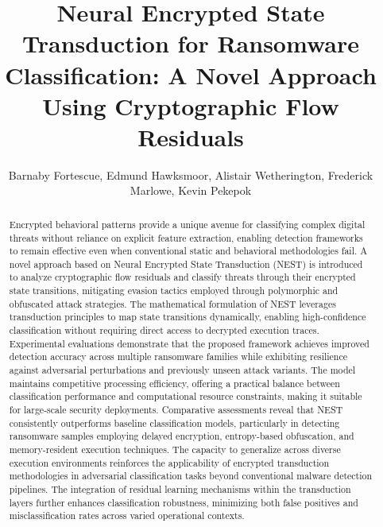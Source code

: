 \documentclass[lettersize,journal]{IEEEtran}
\begin{document}
\title{Neural Encrypted State Transduction for Ransomware Classification: A Novel Approach Using Cryptographic Flow Residuals}

\author{Barnaby Fortescue, Edmund Hawksmoor, Alistair Wetherington, Frederick Marlowe, Kevin Pekepok}


\maketitle



\begin{abstract}

Encrypted behavioral patterns provide a unique avenue for classifying complex digital threats without reliance on explicit feature extraction, enabling detection frameworks to remain effective even when conventional static and behavioral methodologies fail. A novel approach based on Neural Encrypted State Transduction (NEST) is introduced to analyze cryptographic flow residuals and classify threats through their encrypted state transitions, mitigating evasion tactics employed through polymorphic and obfuscated attack strategies. The mathematical formulation of NEST leverages transduction principles to map state transitions dynamically, enabling high-confidence classification without requiring direct access to decrypted execution traces. Experimental evaluations demonstrate that the proposed framework achieves improved detection accuracy across multiple ransomware families while exhibiting resilience against adversarial perturbations and previously unseen attack variants. The model maintains competitive processing efficiency, offering a practical balance between classification performance and computational resource constraints, making it suitable for large-scale security deployments. Comparative assessments reveal that NEST consistently outperforms baseline classification models, particularly in detecting ransomware samples employing delayed encryption, entropy-based obfuscation, and memory-resident execution techniques. The capacity to generalize across diverse execution environments reinforces the applicability of encrypted transduction methodologies in adversarial classification tasks beyond conventional malware detection pipelines. The integration of residual learning mechanisms within the transduction layers further enhances classification robustness, minimizing both false positives and misclassification rates across varied operational contexts. 

\end{abstract}
\end{document}
